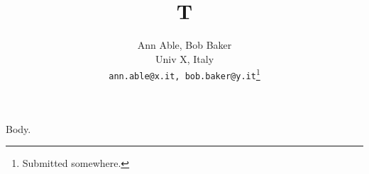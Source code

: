 \documentclass{article}
\begin{document}
\title{T}
\author{Ann Able, Bob Baker \\
Univ X, Italy \\
\texttt{ann.able@x.it, bob.baker@y.it}\thanks{Submitted somewhere.}}
\maketitle
Body.
\end{document}
